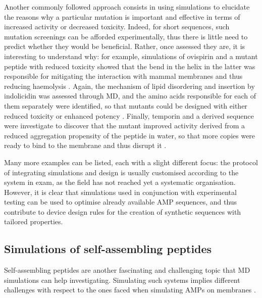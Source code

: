 Another commonly followed approach consists in using simulations to elucidate the reasons why a particular mutation is important and effective in terms of increased activity or decreased toxicity. Indeed, for short sequences, such mutation screenings can be afforded experimentally, thus there is little need to predict whether they would be beneficial. Rather, once assessed they are, it is interesting to understand why: for example, simulations of ovispirin and a mutant peptide with reduced toxicity showed that the bend in the helix in the latter was responsible for mitigating the interaction with mammal membranes and thus reducing haemolysis \cite{Khandelia2005}. Again, the mechanism of lipid disordering and insertion by indolicidin was assessed through MD, and the amino acids responsible for each of them separately were identified, so that mutants could be designed with either reduced toxicity or enhanced potency \cite{Tsai2009}. Finally, temporin and a derived sequence were investigate to discover that the mutant improved activity derived from a reduced aggregation propensity of the peptide in water, so that more copies were ready to bind to the membrane and thus disrupt it \cite{Farrotti2017}.

Many more examples can be listed, each with a slight different focus: the protocol of integrating simulations and design is usually customised according to the system in exam, as the field has not reached yet a systematic organisation.
%
However, it is clear that simulations used in conjunction with experimental testing can be used to optimise  already available AMP sequences, and thus contribute to device design rules for the creation of synthetic sequences with tailored properties.


\subsection{Simulations of self-assembling peptides}
Self-assembling peptides are another fascinating and challenging topic that MD simulations can help investigating. Simulating such systems implies different challenges with respect to the ones faced when simulating AMPs on membranes \cite{Frederix2018,Orsi2018}.

